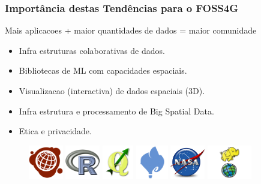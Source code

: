 \documentclass[hyperref={pdfpagelabels=true}]{beamer}
\begin{document}
\begin{frame}
\frametitle{Import\^{a}ncia destas Tend\^{e}ncias para o FOSS4G}

    Mais aplicacoes + maior quantidades de dados = maior comunidade\\%
    \begin{itemize}
    
        \item<2->Infra estruturas colaborativas de dados.%
        \item<2->Bibliotecas de ML com capacidades espaciais.%
        \item<2->Visualizacao (interactiva) de dados espaciais (3D).%
        \item<2->Infra estrutura e processamento de Big Spatial Data.
        \item<2->Etica e privacidade.%
    \end{itemize}                      

    \centering
        \begin{figure}   
            \includegraphics[height=1.5cm]{ushahidi.png}        
            \includegraphics[height=1.5cm]{R.png}
            \includegraphics[height=1.5cm]{qgis.png}
            \includegraphics[height=1.5cm]{cartodb.jpg}
            \includegraphics[height=1.5cm]{nasa.jpg}            
            \includegraphics[height=1.5cm]{GIS4Hadoop.png}
        \end{figure} 
        
    
\end{frame}
\end{document}
